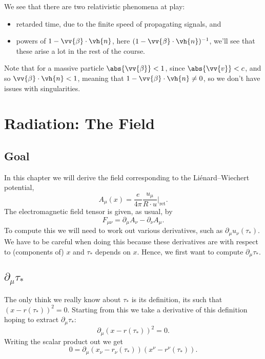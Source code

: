 \documentclass[fleqn]{NotesClass}
\newcommand*{\ret}{{\text{ret}}}
\begin{document}
    We see that there are two relativistic phenomena at play:
    \begin{itemize}
        \item retarded time, due to the finite speed of propagating signals, and
        \item powers of \(1 - \vv{\beta}\cdot\vh{n}\), here \((1 - \vv{\beta}\cdot \vh{n})^{-1}\), we'll see that these arise a lot in the rest of the course.
    \end{itemize}
    Note that for a massive particle \(\abs{\vv{\beta}} < 1\), since \(\abs{\vv{v}} < c\), and so \(\vv{\beta}\cdot\vh{n} < 1\), meaning that \(1 - \vv{\beta}\cdot\vh{n} \ne 0\), so we don't have issues with singularities.
    
    \chapter{Radiation: The Field}
    \section{Goal}
    In this chapter we will derive the field corresponding to the Li\'enard--Wiechert potential,
    \begin{equation}
        A_\mu(x) = \frac{e}{4\pi} \frac{u_\mu}{R \cdot u} \bigg|_{\ret}.
    \end{equation}
    The electromagnetic field tensor is given, as usual, by
    \begin{equation}
        F_{\mu\nu} = \partial_\mu A_\nu - \partial_\nu A_\mu.
    \end{equation}
    To compute this we will need to work out various derivatives, such as \(\partial_\mu u_\nu(\tau_*)\).
    We have to be careful when doing this because these derivatives are with respect to (components of) \(x\) and \(\tau_*\) depends on \(x\).
    Hence, we first want to compute \(\partial_\mu \tau_*\).
    
    \section{\texorpdfstring{\(\partial_\mu \tau_*\)}{Derivative of Proper Retarded Time}}
    The only think we really know about \(\tau_*\) is its definition, its such that \((x - r(\tau_*))^2 = 0\).
    Starting from this we take a derivative of this definition hoping to extract \(\partial_\mu \tau_*\):
    \begin{equation}
        \partial_\mu(x - r(\tau_*))^2 = 0.
    \end{equation}
    Writing the scalar product out we get
    \begin{equation}
        0 = \partial_\mu(x_\nu - r_\nu(\tau_*))(x^\nu - r^\nu(\tau_*)).
    \end{equation}
    
\end{document}
